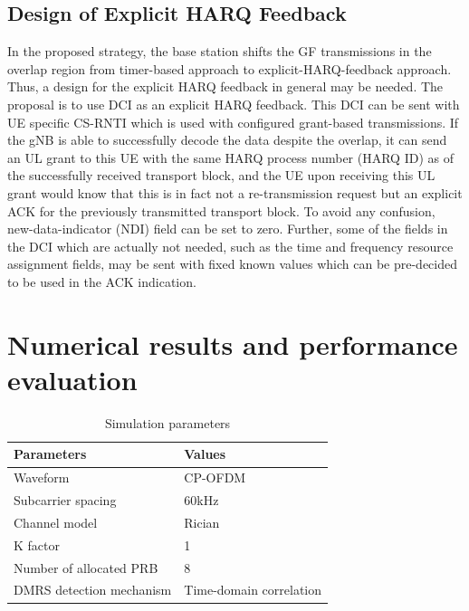\documentclass[conference]{IEEEtran}
\begin{document}
\subsection{Design of Explicit HARQ Feedback}\label{IIDD}
In the proposed strategy, the base station shifts the GF transmissions in the overlap region from timer-based approach to explicit-HARQ-feedback approach. Thus, a design for the explicit HARQ feedback in general may be needed. The proposal is to use DCI as an explicit HARQ feedback. This DCI can be sent with UE specific CS-RNTI which is used with configured grant-based transmissions. If the gNB is able to successfully decode the data despite the overlap, it can send an UL grant to this UE with the same HARQ process number (HARQ ID) as of the successfully received transport block, and the UE upon receiving this UL grant would know that this is in fact not a re-transmission request but an explicit ACK for the previously transmitted transport block. To avoid any confusion, new-data-indicator (NDI) field can be set to zero. Further, some of the fields in the DCI which are actually not needed, such as the time and frequency resource assignment fields, may be sent with fixed known values which can be pre-decided to be used in the ACK indication.

\section{Numerical results and performance evaluation}\label{III}


\begin{table}[htbp]
\caption{Simulation parameters}
\begin{center}
\begin{tabular}{|p{8em}|p{8em}|}
 \hline
 \textbf{Parameters} & \textbf{Values}\\
 \hline
 Waveform & CP-OFDM\\
 \hline
 Subcarrier spacing & 60kHz\\
 \hline
 Channel model & Rician\\
 \hline
 K factor & 1\\
 \hline
 Number of allocated PRB & 8\\
 \hline
 DMRS detection mechanism & Time-domain correlation\\
 

 
 \hline
\end{tabular}
\label{tab1}
\end{center}
\vspace{-8mm}
\end{table}
\end{document}

